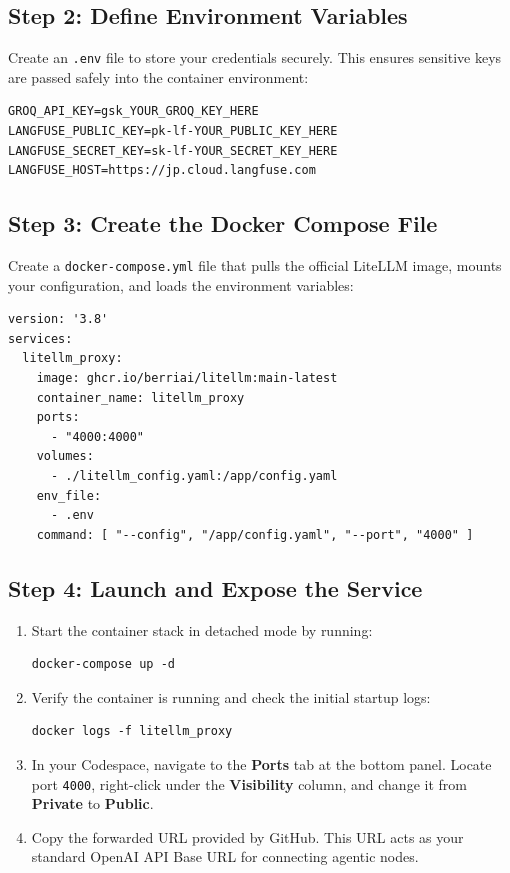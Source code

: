 \documentclass[12pt,a4paper]{article}
\begin{document}
\subsection{Step 2: Define Environment Variables}
Create an \texttt{.env} file to store your credentials securely. This ensures sensitive keys are passed safely into the container environment:
\begin{verbatim}
GROQ_API_KEY=gsk_YOUR_GROQ_KEY_HERE
LANGFUSE_PUBLIC_KEY=pk-lf-YOUR_PUBLIC_KEY_HERE
LANGFUSE_SECRET_KEY=sk-lf-YOUR_SECRET_KEY_HERE
LANGFUSE_HOST=https://jp.cloud.langfuse.com
\end{verbatim}

\subsection{Step 3: Create the Docker Compose File}
Create a \texttt{docker-compose.yml} file that pulls the official LiteLLM image, mounts your configuration, and loads the environment variables:
\begin{verbatim}
version: '3.8'
services:
  litellm_proxy:
    image: ghcr.io/berriai/litellm:main-latest
    container_name: litellm_proxy
    ports:
      - "4000:4000"
    volumes:
      - ./litellm_config.yaml:/app/config.yaml
    env_file:
      - .env
    command: [ "--config", "/app/config.yaml", "--port", "4000" ]
\end{verbatim}

\subsection{Step 4: Launch and Expose the Service}
\begin{enumerate}
    \item Start the container stack in detached mode by running:
    \begin{verbatim}
docker-compose up -d
    \end{verbatim}
    \item Verify the container is running and check the initial startup logs:
    \begin{verbatim}
docker logs -f litellm_proxy
    \end{verbatim}
    \item In your Codespace, navigate to the \textbf{Ports} tab at the bottom panel. Locate port \texttt{4000}, right-click under the \textbf{Visibility} column, and change it from \textbf{Private} to \textbf{Public}. 
    \item Copy the forwarded URL provided by GitHub. This URL acts as your standard OpenAI API Base URL for connecting agentic nodes.
\end{enumerate}
\end{document}
